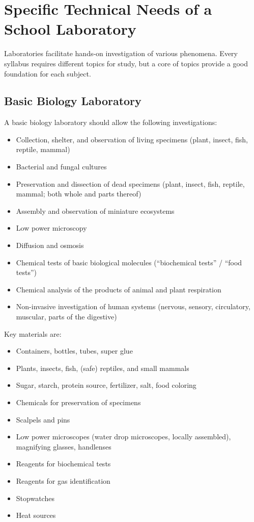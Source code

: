 \chapter{Specific Technical Needs of a School Laboratory}

Laboratories facilitate hands-on investigation of various phenomena. Every syllabus requires different topics for study, but a core of topics provide a good foundation for each subject.

\section{Basic Biology Laboratory}

A basic biology laboratory should allow the following investigations:
\begin{itemize}
\item{Collection, shelter, and observation of living specimens (plant, insect, fish, reptile, mammal)}
\item{Bacterial and fungal cultures}
\item{Preservation and dissection of dead specimens (plant, insect, fish, reptile, mammal; both whole and parts thereof)}
\item{Assembly and observation of miniature ecosystems}
\item{Low power microscopy}
\item{Diffusion and osmosis}
\item{Chemical tests of basic biological molecules (``biochemical tests'' / ``food tests'')}
\item{Chemical analysis of the products of animal and plant respiration}
\item{Non-invasive investigation of human systems (nervous, sensory, circulatory, muscular, parts of the digestive)}
\end{itemize}

Key materials are:
\begin{itemize}
\item{Containers, bottles, tubes, super glue}
\item{Plants, insects, fish, (safe) reptiles, and small mammals}
\item{Sugar, starch, protein source, fertilizer, salt, food coloring}
\item{Chemicals for preservation of specimens}
\item{Scalpels and pins}
\item{Low power microscopes (water drop microscopes, locally assembled), magnifying glasses, handlenses}
\item{Reagents for biochemical tests}
\item{Reagents for gas identification}
\item{Stopwatches}
\item{Heat sources}
\end{itemize}

